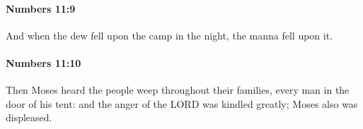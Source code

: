 		\paragraph{Numbers 11:9} %
			\label{NUMBERS-11-9}

			And when the dew fell upon the camp in the night, the manna fell upon it.


		\paragraph{Numbers 11:10} %
			\label{NUMBERS-11-10}

			Then Moses heard the people weep throughout their families, every man in the door of his tent: and the anger of the LORD was kindled greatly; Moses also was displeased.


